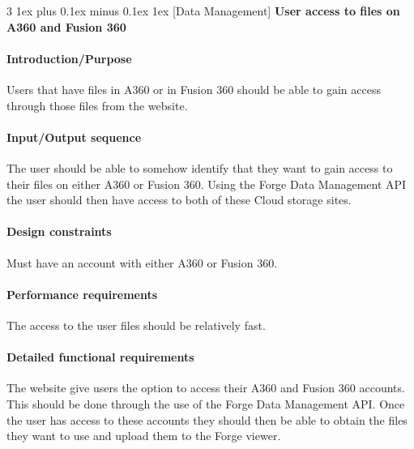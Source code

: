 \documentclass[letterpaper, 10pt, draftclsnofoot, compsoc, onecolumn]{IEEEtran}
\makeatletter
\def\subsubsection{\@startsection{subsubsection}%
                                 {3}%
                                 {\z@}%
                                 {1ex plus 0.1ex minus 0.1ex}%
                                 {1ex}%
                                 {\normalfont\normalsize}}%
\makeatother
\begin{document}

\subsubsection[{Data Management}]{\rmfamily\bfseries\color{black}  
	User access to files on A360 and Fusion 360
}
\smallskip
\paragraph[Introduction/Purpose of this
feature]{\rmfamily\bfseries\color{black}
Introduction/Purpose }
	Users that have files in A360 or in Fusion 360 should be able to gain access through those files from the
	website.

\paragraph[Input/Output sequence]{\rmfamily\bfseries\color{black}
Input/Output sequence }
	The user should be able to somehow identify that they want to gain access to their files on either A360
	or Fusion 360. Using the Forge Data Management API the user should then have access to both of these
	Cloud storage sites.

\paragraph[Design constraints]{\rmfamily\bfseries\color{black} Design
constraints }
	Must have an account with either A360 or Fusion 360. 

\paragraph[Performance requirements]{\rmfamily\bfseries\color{black}
Performance requirements }
	The access to the user files should be relatively  fast.

\paragraph[Detailed functional requirements]{\rmfamily\bfseries\color{black}
Detailed functional requirements }
	The website give users the option to access their A360 and Fusion 360 accounts. This should be done through
	the use of the Forge Data Management API. Once the user has access to these accounts they should then be 
	able to obtain the files they want to use and upload them to the Forge viewer.
\end{document}
